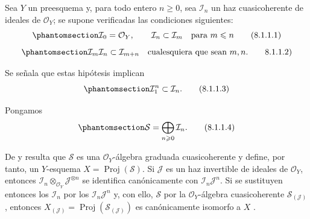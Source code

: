 \documentclass[oneside,10pt]{amsart}
\renewcommand{\leq}{\leqslant}
\renewcommand{\geq}{\geqslant}
\newcommand{\oldpage}[2][]{\marginnote{\normalfont\footnotesize\textbf{#1}~|~#2}\ignorespaces}
\let\EGAOriginalLabel\label
\renewcommand{\label}[1]{\phantomsection\EGAOriginalLabel{#1}}
\begin{document}
\begin{env}[8.1.1]
\label{II.8.1.1-fr}
Sea $Y$ un preesquema y, para todo entero $n\geq0$, sea $\mathcal{I}_n$ un haz cuasicoherente de ideales de $\mathcal{O}_Y$; se supone verificadas las condiciones siguientes:
\begin{equation}
\label{II.8.1.1.1-fr}
  \mathcal{I}_0=\mathcal{O}_Y,\qquad
  \mathcal{I}_n\subset\mathcal{I}_m\quad\text{para }m\leq n
\tag{8.1.1.1}
\end{equation}
\begin{equation}
\label{II.8.1.1.2-fr}
  \mathcal{I}_m\mathcal{I}_n\subset\mathcal{I}_{m+n}
  \quad\text{cualesquiera que sean }m,n.
\tag*{8.1.1.2)}
\end{equation}

\oldpage[II]{153}
Se señala que estas hipótesis implican
\begin{equation}
\label{II.8.1.1.3-fr}
  \mathcal{I}_1^n\subset\mathcal{I}_n.
\tag{8.1.1.3}
\end{equation}

Pongamos
\begin{equation}
\label{II.8.1.1.4-fr}
  \mathcal{S}=\bigoplus_{n\geq0}\mathcal{I}_n.
\tag{8.1.1.4}
\end{equation}

De  y  resulta que $\mathcal{S}$ es una $\mathcal{O}_Y$-álgebra graduada cuasicoherente y define, por tanto, un $Y$-esquema $X=\operatorname{Proj}(\mathcal{S})$.
Si $\mathcal{J}$ es un haz invertible de ideales de $\mathcal{O}_Y$, entonces $\mathcal{I}_n\otimes_{\mathcal{O}_Y}\mathcal{J}^{\otimes n}$ se identifica canónicamente con $\mathcal{I}_n\mathcal{J}^n$.
Si se sustituyen entonces los $\mathcal{I}_n$ por los $\mathcal{I}_n\mathcal{J}^n$ y, con ello, $\mathcal{S}$ por la $\mathcal{O}_Y$-álgebra cuasicoherente $\mathcal{S}_{(\mathcal{J})}$, entonces $X_{(\mathcal{J})}=\operatorname{Proj}(\mathcal{S}_{(\mathcal{J})})$ es canónicamente isomorfo a $X$ .
\end{env}
\end{document}
